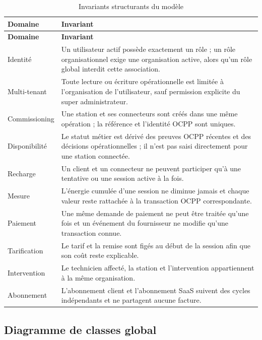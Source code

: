 \begin{longtable}{|p{3.7cm}|p{10.8cm}|}
  \caption{Invariants structurants du modèle}
  \label{tab:domain-invariants}\\
  \hline
  \textbf{Domaine} & \textbf{Invariant}\\
  \hline
  \endfirsthead
  \hline
  \textbf{Domaine} & \textbf{Invariant}\\
  \hline
  \endhead
  Identité &
  Un utilisateur actif possède exactement un rôle ; un rôle organisationnel exige
  une organisation active, alors qu'un rôle global interdit cette association.\\\hline
  Multi-tenant &
  Toute lecture ou écriture opérationnelle est limitée à l'organisation de
  l'utilisateur, sauf permission explicite du super administrateur.\\\hline
  Commissioning &
  Une station et ses connecteurs sont créés dans une même opération ; la référence
  et l'identité OCPP sont uniques.\\\hline
  Disponibilité &
  Le statut métier est dérivé des preuves OCPP récentes et des décisions
  opérationnelles ; il n'est pas saisi directement pour une station connectée.\\\hline
  Recharge &
  Un client et un connecteur ne peuvent participer qu'à une tentative ou une
  session active à la fois.\\\hline
  Mesure &
  L'énergie cumulée d'une session ne diminue jamais et chaque valeur reste
  rattachée à la transaction OCPP correspondante.\\\hline
  Paiement &
  Une même demande de paiement ne peut être traitée qu'une fois et un événement du
  fournisseur ne modifie qu'une transaction connue.\\\hline
  Tarification &
  Le tarif et la remise sont figés au début de la session afin que son coût reste
  explicable.\\\hline
  Intervention &
  Le technicien affecté, la station et l'intervention appartiennent à la même
  organisation.\\\hline
  Abonnement &
  L'abonnement client et l'abonnement SaaS suivent des cycles indépendants et ne
  partagent aucune facture.\\
  \hline
\end{longtable}

\clearpage
\subsection{Diagramme de classes global}


